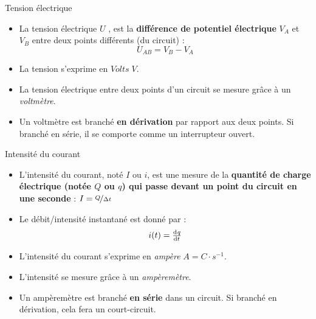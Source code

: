 \documentclass[11pt,a4paper]{article}
\begin{document}
\begin{multicols}{2}
\begin{defn}{Tension électrique}
\begin{itemize}
    \item La tension électrique $U$ , est la \textbf{différence de potentiel électrique} $V_A$ et $V_B$ entre deux points différents (du circuit) : 
    \[ U_{AB} = V_B - V_A \]
    \item La tension s'exprime en $Volts\; V$. 
    \item La tension électrique entre deux points d'un circuit se mesure grâce à un \textit{voltmètre}. 
    \item Un voltmètre est branché \textbf{en dérivation} par rapport aux deux points. Si branché en série, il se comporte comme un interrupteur ouvert. 
\end{itemize}
\end{defn}
\begin{defn}{Intensité du courant}
\begin{itemize}
    \item L'intensité du courant, noté $I$ ou $i$, est une mesure de la \textbf{quantité de charge électrique (notée $Q$ ou $q$) qui passe devant un point du circuit en une seconde} : $I = \nicefrac{Q}{\Delta t}$
    \item Le débit/intensité instantané est donné par : \[i(t) = \od{q}{t}\]
    \item L'intensité du courant s'exprime en \emph{ampère} $A=C\cdot s^{-1}$. 
    \item L'intensité se mesure grâce à un \textit{ampèremètre}. 
    \item Un ampèremètre est branché \textbf{en série} dans un circuit. Si branché en dérivation, cela fera un court-circuit. 
\end{itemize}
\end{defn}
\end{multicols}
\end{document}
